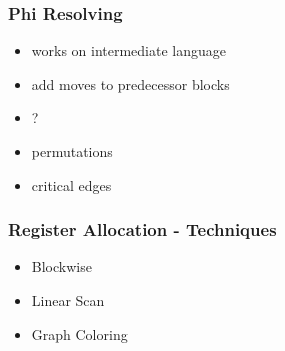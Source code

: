 \documentclass[navbaroff,en]{sdqbeamer}
\begin{document}
\begin{frame}


\end{frame}

\begin{frame}
    \frametitle{Phi Resolving}

    \begin{itemize}
        \item works on intermediate language
        \item add moves to predecessor blocks
        \item ?
        \item permutations
        \item critical edges
    \end{itemize}

\end{frame}

\begin{frame}
    \frametitle{Register Allocation - Techniques}

    \begin{itemize}
    	\item Blockwise
        \item Linear Scan
        \item Graph Coloring
    \end{itemize}

\end{frame}
\end{document}
